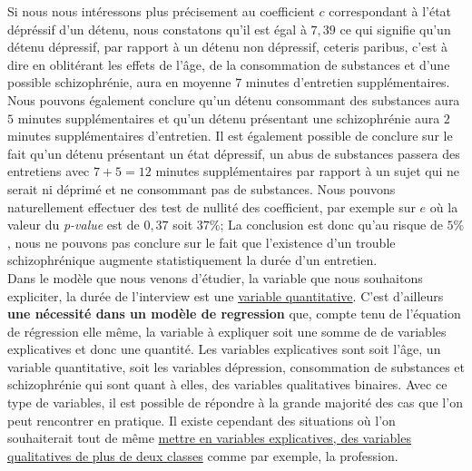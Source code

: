 Si nous nous intéressons plus précisement au coefficient $c$ correspondant à l'état dépréssif d'un détenu, nous constatons qu'il est égal à $7,39$ ce qui signifie qu'un détenu dépressif, par rapport à un détenu non dépressif, ceteris paribus, c'est à dire en oblitérant les effets de l'âge, de la consommation de substances et d'une possible schizophrénie, aura en moyenne $7$ minutes d'entretien supplémentaires. Nous pouvons également conclure qu'un détenu consommant des substances aura $5$ minutes supplémentaires et qu'un détenu présentant une schizophrénie aura $2$ minutes supplémentaires d'entretien.\newline
Il est également possible de conclure sur le fait qu'un détenu présentant un état dépressif, un abus de substances passera des entretiens avec $7+5 = 12$ minutes supplémentaires par rapport à un sujet qui ne serait ni déprimé et ne consommant pas de substances.\newline
Nous pouvons naturellement effectuer des test de nullité des coefficient, par exemple sur $e$ où la valeur du \textit{p-value} est de $0,37$ soit $37\%$; La conclusion est donc qu'au risque de $5\%$, nous ne pouvons pas conclure sur le fait que l'existence d'un trouble schizophrénique augmente statistiquement la durée d'un entretien.\newline
\\
Dans le modèle que nous venons d'étudier, la variable que nous souhaitons expliciter, la durée de l'interview est une \underline{variable quantitative}. C'est d'ailleurs  \textbf{une nécessité dans un modèle de regression} que, compte tenu de l'équation de régression elle même, la variable à expliquer soit une somme de de variables explicatives et donc une quantité.\newline
Les variables explicatives sont soit l'âge, un variable quantitative, soit les variables dépression, consommation de substances et schizophrénie qui sont quant à elles, des variables qualitatives binaires. Avec ce type de variables, il est possible de répondre à la grande majorité des cas que l'on peut rencontrer en pratique.\newline
Il existe cependant des situations où l'on souhaiterait tout de même \underline{mettre en variables explicatives, des variables qualitatives de plus de deux classes} comme par exemple, la profession.\newline

